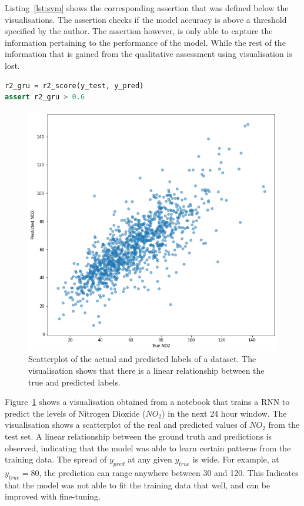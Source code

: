 \documentclass[conference]{IEEEtran}
\begin{document}
Listing~\ref{lst:svm} shows the corresponding assertion that was defined below the visualisations. The assertion checks if the model accuracy is above a threshold specified by the author. The assertion however, is only able to capture the information pertaining to the performance of the model. While the rest of the information that is gained from the qualitative assessment using visualisation is lost.

\begin{lstlisting}[language=Python, caption={Assertion to check that the Coefficient of Determination ($R^2$) is higher than the specified threshold.}, label={lst:r2}]
r2_gru = r2_score(y_test, y_pred)
assert r2_gru > 0.6
\end{lstlisting}

\begin{figure}
  \includegraphics[width=\linewidth]{../catalogue/select-332a.png}
  \caption{Scatterplot of the actual and predicted labels of a dataset. The visualisation shows that there is a linear relationship between the true and predicted labels.}\label{fig:r2}
\end{figure}

Figure~\ref{fig:r2} shows a visualisation obtained from a notebook that trains a RNN to predict the levels of Nitrogen Dioxide ($NO_2$) in the next 24 hour window. The visualisation shows a scatterplot of the real and predicted values of $NO_2$ from the test set. A linear relationship between the ground truth and predictions is observed, indicating that the model was able to learn certain patterns from the training data. The spread of $y_{pred}$ at any given $y_{true}$ is wide. For example, at $y_{true} = 80$, the prediction can range anywhere between 30 and 120. This Indicates that the model was not able to fit the training data that well, and can be improved with fine-tuning.
\end{document}
